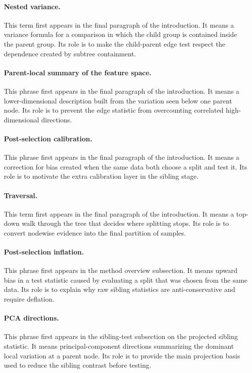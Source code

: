 \paragraph{Nested variance.}
This term first appears in the final paragraph of the introduction. It means a
variance formula for a comparison in which the child group is contained inside
the parent group. Its role is to make the child-parent edge test respect the
dependence created by subtree containment.

\paragraph{Parent-local summary of the feature space.}
This phrase first appears in the final paragraph of the introduction. It means
a lower-dimensional description built from the variation seen below one parent
node. Its role is to prevent the edge statistic from overcounting correlated
high-dimensional directions.

\paragraph{Post-selection calibration.}
This phrase first appears in the final paragraph of the introduction. It means
a correction for bias created when the same data both choose a split and test
it. Its role is to motivate the extra calibration layer in the sibling stage.

\paragraph{Traversal.}
This term first appears in the final paragraph of the introduction. It means a
top-down walk through the tree that decides where splitting stops. Its role is
to convert nodewise evidence into the final partition of samples.

\paragraph{Post-selection inflation.}
This phrase first appears in the method overview subsection. It means upward
bias in a test statistic caused by evaluating a split that was chosen from the
same data. Its role is to explain why raw sibling statistics are
anti-conservative and require deflation.

\paragraph{PCA directions.}
This phrase first appears in the sibling-test subsection on the projected
sibling statistic. It means principal-component directions summarizing the
dominant local variation at a parent node. Its role is to provide the main
projection basis used to reduce the sibling contrast before testing.

